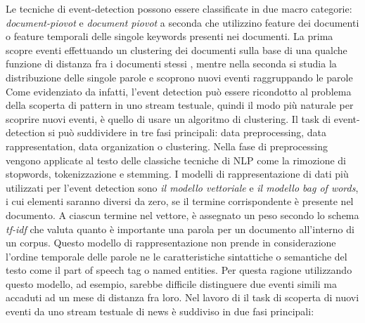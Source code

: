 Le tecniche di event-detection possono essere classificate in due macro categorie: \emph{document-piovot} e \emph{document piovot} a seconda che utilizzino feature dei documenti o feature temporali delle singole keywords presenti nei documenti. 
La prima scopre eventi effettuando un clustering dei documenti sulla base di una qualche funzione di distanza fra i documenti stessi \cite{Yang:1998:SRO:290941.290953}, mentre nella seconda si studia la distribuzione delle singole parole e scoprono nuovi eventi raggruppando le parole \cite{Kleinberg:2002:BHS:775047.775061} 
Come evidenziato da \cite{Yang:1998:SRO:290941.290953} infatti, l'event detection può essere ricondotto al problema della scoperta di pattern in uno stream testuale, quindi il modo più naturale per scoprire nuovi eventi, è quello di usare un algoritmo di clustering. Il task di event-detection si può suddividere in tre fasi principali: data preprocessing, data rappresentation, data organization o clustering. Nella fase di preprocessing vengono applicate al testo delle classiche tecniche di NLP come la rimozione di stopwords, tokenizzazione e stemming.
I modelli di rappresentazione di dati più utilizzati per l'event detection sono  \emph{il modello vettoriale} e  \emph{il modello bag of words}, i cui elementi saranno diversi da zero, se il termine corrispondente è presente nel documento. A ciascun termine nel vettore, è assegnato un peso secondo lo schema \emph{tf-idf}\cite{Salton:1989:ATP:77013} che valuta quanto è importante una parola per un documento all'interno di un corpus. Questo modello di rappresentazione non prende in considerazione l'ordine temporale delle parole ne le caratteristiche sintattiche o semantiche del testo come il part of speech tag o named entities. Per questa ragione utilizzando questo modello, ad esempio, sarebbe difficile distinguere due eventi simili ma accaduti ad un mese di distanza fra loro. Nel lavoro di \cite{Yang:1998:SRO:290941.290953} il task di scoperta di nuovi eventi da uno stream testuale di news è suddiviso in due fasi principali:

